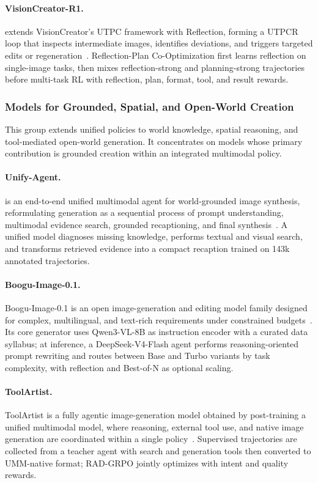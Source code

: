 \paragraph{VisionCreator-R1.}
 extends VisionCreator's UTPC framework with Reflection, forming a UTPCR loop that inspects intermediate images, identifies deviations, and triggers targeted edits or regeneration~\cite{avg260308812}. Reflection-Plan Co-Optimization first learns reflection on single-image tasks, then mixes reflection-strong and planning-strong trajectories before multi-task RL with reflection, plan, format, tool, and result rewards.


\subsubsection{Models for Grounded, Spatial, and Open-World Creation}
This group extends unified policies to world knowledge, spatial reasoning, and tool-mediated open-world generation. It concentrates on models whose primary contribution is grounded creation within an integrated multimodal policy.

\paragraph{Unify-Agent.}
 is an end-to-end unified multimodal agent for world-grounded image synthesis, reformulating generation as a sequential process of prompt understanding, multimodal evidence search, grounded recaptioning, and final synthesis~\cite{avg260329620}.  A unified model diagnoses missing knowledge, performs textual and visual search, and transforms retrieved evidence into a compact recaption trained on 143k annotated trajectories.

\paragraph{Boogu-Image-0.1.}
Boogu-Image-0.1 is an open image-generation and editing model family designed for complex, multilingual, and text-rich requirements under constrained budgets~\cite{avg260713125}. Its core generator uses Qwen3-VL-8B as instruction encoder with a curated data syllabus; at inference, a DeepSeek-V4-Flash agent performs reasoning-oriented prompt rewriting and routes between Base and Turbo variants by task complexity, with reflection and Best-of-N as optional scaling. 

\paragraph{ToolArtist.}
ToolArtist is a fully agentic image-generation model obtained by post-training a unified multimodal model, where reasoning, external tool use, and native image generation are coordinated within a single policy~\cite{zhao2026toolartist}. Supervised trajectories are collected from a teacher agent with search and generation tools then converted to UMM-native format; RAD-GRPO jointly optimizes with intent and quality rewards. 

